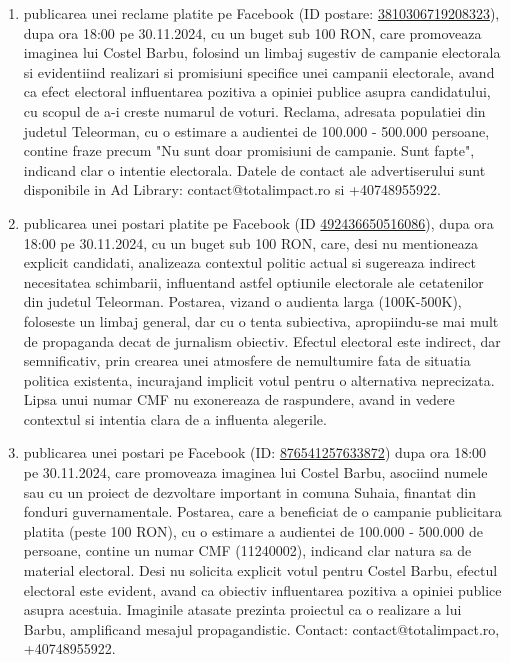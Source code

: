 \documentclass[a4paper,12pt]{article}
\begin{document}
\begin{enumerate}[leftmargin=*, label=\arabic*.)]
    \item publicarea unei reclame platite pe Facebook (ID postare: \href{https://www.facebook.com/ads/library/?id=3810306719208323}{3810306719208323}), dupa ora 18:00 pe 30.11.2024, cu un buget sub 100 RON, care promoveaza imaginea lui Costel Barbu, folosind un limbaj sugestiv de campanie electorala si evidentiind realizari si promisiuni specifice unei campanii electorale, avand ca efect electoral influentarea pozitiva a opiniei publice asupra candidatului, cu scopul de a-i creste numarul de voturi.  Reclama, adresata populatiei din judetul Teleorman, cu o estimare a audientei de 100.000 - 500.000 persoane,  contine fraze precum "Nu sunt doar promisiuni de campanie. Sunt fapte",  indicand clar o intentie electorala.  Datele de contact ale advertiserului sunt disponibile in Ad Library: contact@totalimpact.ro si +40748955922.
    \item publicarea unei postari platite pe Facebook (ID \href{https://www.facebook.com/ads/library/?id=492436650516086}{492436650516086}), dupa ora 18:00 pe 30.11.2024, cu un buget sub 100 RON, care, desi nu mentioneaza explicit candidati, analizeaza contextul politic actual si sugereaza indirect necesitatea schimbarii, influentand astfel optiunile electorale ale cetatenilor din judetul Teleorman.  Postarea, vizand o audienta larga (100K-500K),  foloseste un limbaj general, dar cu o tenta subiectiva, apropiindu-se mai mult de propaganda decat de jurnalism obiectiv.  Efectul electoral este indirect, dar semnificativ, prin crearea unei atmosfere de nemultumire fata de situatia politica existenta, incurajand implicit votul pentru o alternativa neprecizata.  Lipsa unui numar CMF nu exonereaza de raspundere, avand in vedere contextul si intentia clara de a influenta alegerile.
    \item publicarea unei postari pe Facebook (ID: \href{https://www.facebook.com/ads/library/?id=876541257633872}{876541257633872}) dupa ora 18:00 pe 30.11.2024, care promoveaza imaginea lui Costel Barbu, asociind numele sau cu un proiect de dezvoltare important in comuna Suhaia, finantat din fonduri guvernamentale.  Postarea, care a beneficiat de o campanie publicitara platita (peste 100 RON), cu o estimare a audientei de 100.000 - 500.000 de persoane,  contine un numar CMF (11240002), indicand clar natura sa de material electoral.  Desi nu solicita explicit votul pentru Costel Barbu, efectul electoral este evident, avand ca obiectiv influentarea pozitiva a opiniei publice asupra acestuia.  Imaginile atasate prezinta proiectul ca o realizare a lui Barbu, amplificand mesajul propagandistic.  Contact: contact@totalimpact.ro, +40748955922.
\end{enumerate}
\end{document}
